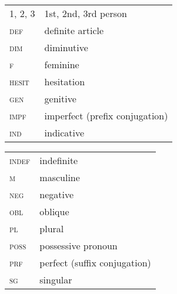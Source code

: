 \documentclass[output=paper]{langsci/langscibook}
\begin{document}
\begin{tabularx}{.55\textwidth}{@{}lQ@{}}
\textsc{1, 2, 3} & 1st, 2nd, 3rd person \\
\textsc{def} & definite article \\
\textsc{dim} & diminutive \\
\textsc{f} & feminine \\
\textsc{hesit} & hesitation \\
\textsc{gen} & genitive \\
\textsc{impf} & imperfect (prefix conjugation) \\
\textsc{ind} & indicative \\
\end{tabularx}%
\begin{tabularx}{.5\textwidth}{@{}lQ@{}}
\textsc{indef} & indefinite \\
\textsc{m} & masculine \\
\textsc{neg} & negative \\
\textsc{obl} & oblique \\
\textsc{pl} & plural \\
\textsc{poss} & possessive pronoun \\
\textsc{prf} & perfect (suffix conjugation) \\
\textsc{sg} & singular \\
\end{tabularx}%


\sloppy\printbibliography[heading=subbibliography,notkeyword=this]
\end{document}
